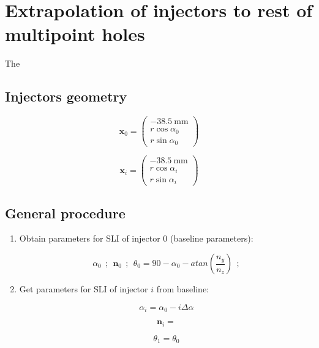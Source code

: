 \clearpage

\section{Extrapolation of injectors to rest of multipoint holes}

The 

\subsection{Injectors geometry}

\begin{equation}
\boldsymbol{x}_0 =  \begin{pmatrix} - 38.5 ~\mathrm{mm} \\ r \cos \alpha_0 \\ r \sin \alpha_0 \end{pmatrix}
\end{equation}

\begin{equation}
\boldsymbol{x}_i =  \begin{pmatrix} - 38.5 ~\mathrm{mm} \\ r \cos \alpha_i \\ r \sin \alpha_i \end{pmatrix}
\end{equation}


\subsection{General procedure}

\begin{enumerate}

	\item Obtain parameters for SLI of injector 0 (baseline parameters):
	
	\begin{equation}
	\alpha_0  ~~ ; ~~ \boldsymbol{n}_0 ~~ ; ~~ \theta_0 = 90 - \alpha_0 - atan \left( \frac{n_y}{n_z} \right) ~~ ; 
	\end{equation}

	\item Get parameters for SLI of injector $i$ from baseline:
	
	\begin{equation}
	\alpha_i = \alpha_0 - i \Delta \alpha 
	\end{equation}
	
	\begin{equation}
	\boldsymbol{n}_i = 
	\end{equation}
	
	\begin{equation}
	\theta_1 = \theta_0
	\end{equation}
	

\end{enumerate}

